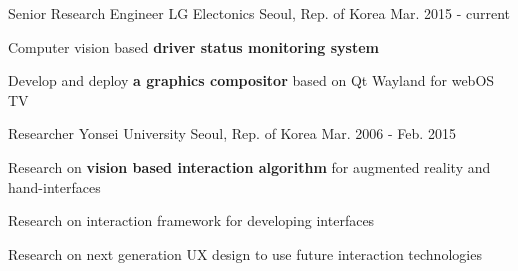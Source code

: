 


\begin{cventries}

  \cventry
    {Senior Research Engineer} %
    {LG Electonics} %
    {Seoul, Rep. of Korea} %
    {Mar. 2015 - current} %
    {
      \begin{cvitems} %
        \item {Computer vision based \textbf{driver status monitoring system}}
        \item {Develop and deploy \textbf{a graphics compositor} based on Qt Wayland for webOS TV}
      \end{cvitems}
    }


  \cventry
    {Researcher} %
    {Yonsei University} %
    {Seoul, Rep. of Korea} %
    {Mar. 2006 - Feb. 2015} %
    {
      \begin{cvitems} %
        \item {Research on \textbf{vision based interaction algorithm} for augmented reality and hand-interfaces}
        \item {Research on interaction framework for developing interfaces}
        \item {Research on next generation UX design to use future interaction technologies}
      \end{cvitems}
    }

\end{cventries}
